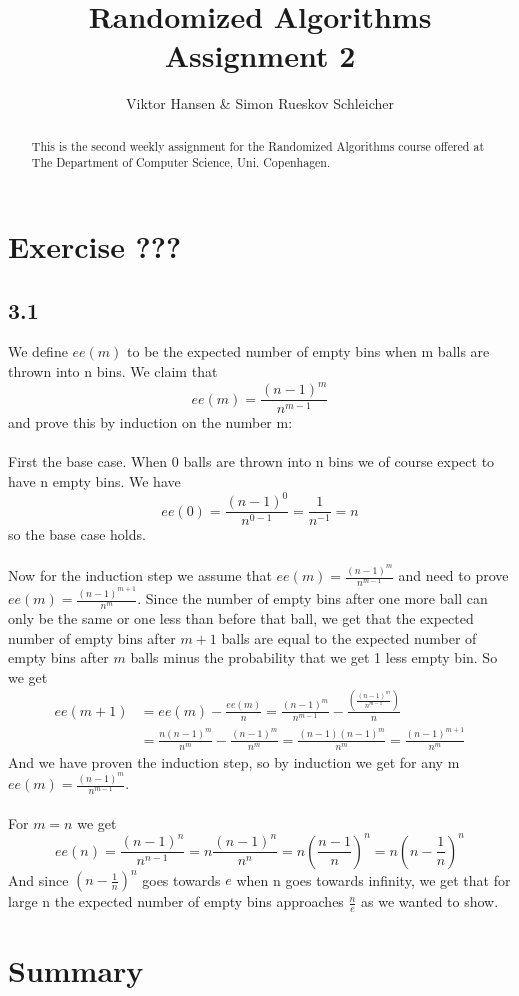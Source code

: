 \documentclass[12pt]{article}
\begin{document}
\nocite{*}


\title{Randomized Algorithms \\
       Assignment 2}

\author{Viktor Hansen \& Simon Rueskov Schleicher}

\maketitle

\begin{abstract}
  This is the second weekly assignment for the Randomized Algorithms course offered at The Department of Computer Science, Uni. Copenhagen.
\end{abstract}

\pagebreak

\section*{Exercise ???}

\subsection*{3.1}
We define $ee(m)$ to be the expected number of empty bins when m balls are thrown into n bins. We claim that $$ee(m)=\frac{(n-1)^m}{n^{m-1}}$$ and prove this by induction on the number m:\\
\\
First the base case. When 0 balls are thrown into n bins we of course expect to have n empty bins. We have $$ee(0)=\frac{(n-1)^0}{n^{0-1}}=\frac{1}{n^{-1}}=n$$ so the base case holds.\\
\\
Now for the induction step we assume that $ee(m)=\frac{(n-1)^m}{n^{m-1}}$ and need to prove $ee(m)=\frac{(n-1)^{m+1}}{n^m}$. Since the number of empty bins after one more ball can only be the same or one less than before that ball, we get that the expected number of empty bins after $m+1$ balls are equal to the expected number of empty bins after $m$ balls minus the probability that we get 1 less empty bin. So we get \begin{align*}ee(m+1)&=ee(m)-\frac{ee(m)}{n}=\frac{(n-1)^m}{n^{m-1}}-\frac{\left(\frac{(n-1)^m}{n^{m-1}}\right)}{n}\\&=\frac{n(n-1)^m}{n^m}-\frac{(n-1)^m}{n^m}=\frac{(n-1)(n-1)^m}{n^m}=\frac{(n-1)^{m+1}}{n^m}\end{align*}
And we have proven the induction step, so by induction we get for any m $ee(m)=\frac{(n-1)^m}{n^{m-1}}$.\\
\\
For $m=n$ we get $$ee(n)=\frac{(n-1)^n}{n^{n-1}}=n\frac{(n-1)^n}{n^n}=n\left(\frac{n-1}{n}\right)^n=n\left(n-\frac{1}{n}\right)^n$$ And since $\left(n-\frac{1}{n}\right)^n$ goes towards $e$ when n goes towards infinity, we get that for large n the expected number of empty bins approaches $\frac{n}{e}$ as we wanted to show.

\pagebreak

\section*{Summary}
\end{document}
